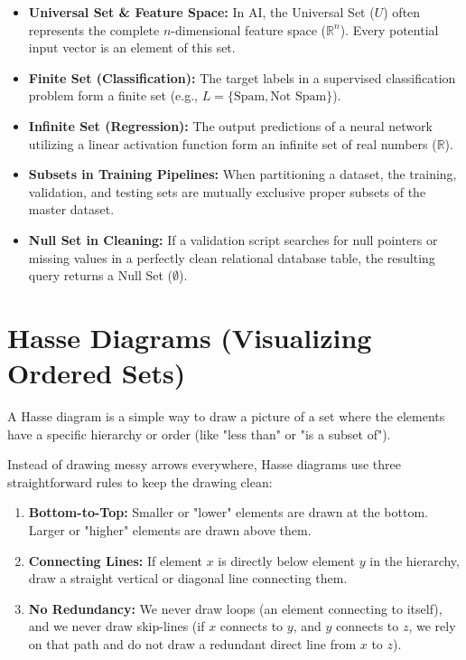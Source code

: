 \documentclass{article}
\begin{document}
\begin{itemize}
    \item \textbf{Universal Set \& Feature Space:} In AI, the Universal Set ($U$) often represents the complete $n$-dimensional feature space ($\mathbb{R}^n$). Every potential input vector is an element of this set.
    \item \textbf{Finite Set (Classification):} The target labels in a supervised classification problem form a finite set (e.g., $L = \{\text{Spam}, \text{Not Spam}\}$).
    \item \textbf{Infinite Set (Regression):} The output predictions of a neural network utilizing a linear activation function form an infinite set of real numbers ($\mathbb{R}$).
    \item \textbf{Subsets in Training Pipelines:} When partitioning a dataset, the training, validation, and testing sets are mutually exclusive proper subsets of the master dataset.
    \item \textbf{Null Set in Cleaning:} If a validation script searches for null pointers or missing values in a perfectly clean relational database table, the resulting query returns a Null Set ($\emptyset$).
\end{itemize}

\section{Hasse Diagrams (Visualizing Ordered Sets)}
A Hasse diagram is a simple way to draw a picture of a set where the elements have a specific hierarchy or order (like "less than" or "is a subset of"). 

Instead of drawing messy arrows everywhere, Hasse diagrams use three straightforward rules to keep the drawing clean:
\begin{enumerate}
    \item \textbf{Bottom-to-Top:} Smaller or "lower" elements are drawn at the bottom. Larger or "higher" elements are drawn above them.
    \item \textbf{Connecting Lines:} If element $x$ is directly below element $y$ in the hierarchy, draw a straight vertical or diagonal line connecting them. 
    \item \textbf{No Redundancy:} We never draw loops (an element connecting to itself), and we never draw skip-lines (if $x$ connects to $y$, and $y$ connects to $z$, we rely on that path and do not draw a redundant direct line from $x$ to $z$).
\end{enumerate}
\end{document}
